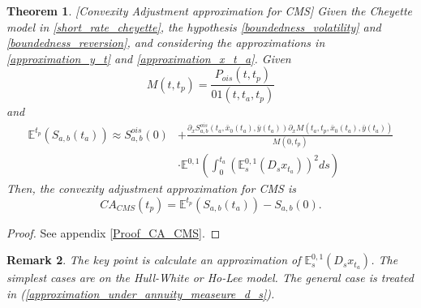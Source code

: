 \documentclass[a4paper,10pt]{article}
\newtheorem{theorem}{Theorem}[section]
\newtheorem{remark}[theorem]{Remark}
\newcommand{\1}{\mathbf{1}}
\begin{document}
\begin{theorem}\label{Th_CA_CMS}[Convexity Adjustment approximation for CMS]
Given the Cheyette model in \eqref{short_rate_cheyette}, the hypothesis \ref{boundedness_volatility} and \ref{boundedness_reversion}, and considering the approximations in \eqref{approximation_y_t} and \eqref{approximation_x_t_a}. Given
\begin{equation}
M(t,t_p)= \frac{P_{ois}(t,t_p)}{01(t,t_a,t_p)}
\end{equation}
and 
\begin{align}\label{cms_first_order_convexity}
\mathbb{E}^{t_p}\left(S_{a,b}(t_a)\right) \approx  S^{ois}_{a,b}(0) &+ \frac{\partial_x S^{ois}_{a,b}(t_a, \bar{x}_0(t_a),\bar{y}(t_a))\partial_x M(t_a,t_p, \bar{x}_0(t_a),\bar{y}(t_a))}{M(0,t_p)} \nonumber \\
\qquad\qquad &\cdot \mathbb{E}^{0,1}\left( \int_{0}^{t_a} \left(\mathbb{E}_s^{0,1}\left( D_s x_{t_a}\right)\right)^{2} ds  \right)
\end{align}
Then, the convexity adjustment approximation for CMS is
\begin{equation}
CA_{CMS}(t_p) = \mathbb{E}^{t_p}\left(S_{a,b}(t_a)\right) - S_{a,b}(0).
\end{equation} 
\end{theorem}
\begin{proof}
See appendix \ref{Proof_CA_CMS}.
\end{proof}

\begin{remark}
The key point is calculate an approximation of $\mathbb{E}_s^{0,1}\left( D_s x_{t_a}\right)$. The simplest cases are on the Hull-White or Ho-Lee model. The general case is treated in (\ref{approximation_under_annuity_measeure_d_s}). 
\end{remark}
\end{document}
